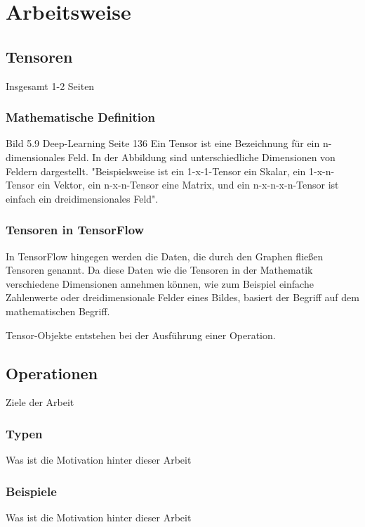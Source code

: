 \chapter{Arbeitsweise}
\label{chap:arbeitsweise}
\section{Tensoren}
\label{sec:tensoren}
\printsubchapterauthor{\authorNiklas}
Insgesamt 1-2 Seiten

\subsection{Mathematische Definition}
\label{sec:mathematischeDefinition}
Bild 5.9 Deep-Learning Seite 136
Ein Tensor ist eine Bezeichnung für ein n-dimensionales Feld. In der Abbildung sind unterschiedliche Dimensionen von Feldern dargestellt. "Beispielsweise ist ein 1-x-1-Tensor ein Skalar, ein 1-x-n-Tensor ein Vektor, ein n-x-n-Tensor eine Matrix, und ein n-x-n-x-n-Tensor ist einfach ein dreidimensionales Feld"\citep{Einfuehrung}.

\subsection{Tensoren in TensorFlow}
\label{sec:tensorenInTensorflow}
In TensorFlow hingegen werden die Daten, die durch den Graphen fließen Tensoren genannt. Da diese Daten wie die Tensoren in der Mathematik verschiedene Dimensionen annehmen können, wie zum Beispiel einfache Zahlenwerte oder dreidimensionale Felder eines Bildes, basiert der Begriff auf dem mathematischen Begriff.

Tensor-Objekte entstehen bei der Ausführung einer Operation. 

\section{Operationen}
\label{sec:operationen}
\printsubchapterauthor{\authorMarco}
Ziele der Arbeit

\subsection{Typen}
\label{sec:typen}
Was ist die Motivation hinter dieser Arbeit

\subsection{Beispiele}
\label{sec:beispiele}
Was ist die Motivation hinter dieser Arbeit


